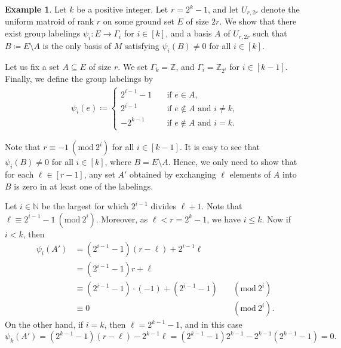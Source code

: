 \documentclass{article}
\newcommand{\Mod}[1]{\ (\mathrm{mod}\ #1)}
\theoremstyle{definition}
\newtheorem{example}[theorem]{Example}
\newcommand{\N}{\mathbb{N}}
\newcommand{\Z}{\mathbb{Z}}
\begin{document}
\begin{example} \label{ex:tight}
    Let $k$ be a positive integer. Let $r = 2^k-1$, and let $U_{r,2r}$ denote the uniform matroid of rank $r$ on some ground set $E$ of size $2r$. We show that there exist group labelings $\psi_i \colon E \to \Gamma_i$ for $i \in [k]$, and a basis $A$ of $U_{r,2r}$ such that $B \coloneqq E \setminus A$ is the only basis of $M$ satisfying $\psi_i(B) \ne 0$ for all $i \in [k]$.
    
    Let us fix a set $A \subseteq E$ of size $r$.
    We set $\Gamma_{k} = \Z$, and $\Gamma_i = \Z_{2^i}$ for $i \in [k-1]$. Finally, we define the group labelings by
    \begin{align}
        \psi_i(e) \coloneqq
        \begin{cases}
            2^{i-1} - 1 \hspace{1em} &\text{if } e \in A, \\
            2^{i-1} \hspace{1em} &\text{if } e \notin A \text{ and } i \neq k, \\
            -2^{k-1} \hspace{1em} &\text{if } e \notin A \text{ and } i = k.  
        \end{cases}
    \end{align}
    
    Note that $r \equiv -1 \Mod{2^i}$ for all $i \in [k-1]$. 
    It is easy to see that $\psi_i(B) \neq 0$ for all $i \in [k]$, where $B = E \setminus A$.
    Hence, we only need to show that for each $\ell \in [r-1]$, any set $A'$ obtained by exchanging $\ell$ elements of $A$ into $B$ is zero in at least one of the labelings.
    
    Let $i \in \N$ be the largest for which $2^{i-1}$ divides $\ell +1$. Note that $\ell \equiv 2^{i-1} - 1 \Mod{2^i}$. Moreover, as $\ell < r = 2^k - 1$, we have $i \leq k$. Now if $i < k$, then
    \begin{align}
        \psi_i(A') &= (2^{i-1} - 1)(r - \ell) + 2^{i-1}\ell \\
        &= (2^{i-1}-1)r + \ell \\
        &\equiv (2^{i-1}-1) \cdot (-1) + (2^{i-1} - 1) &&\Mod{2^i} \\ & \equiv 0 &&\Mod{2^i}.
    \end{align} 
    On the other hand, if $i = k$, then $\ell = 2^{k-1} - 1$, and in this case \[\psi_k(A') = (2^{k-1}-1)(r - \ell) - 2^{k-1}\ell = (2^{k-1}-1)2^{k-1} - 2^{k-1}(2^{k-1}-1) = 0.\]
\end{example}
\end{document}
